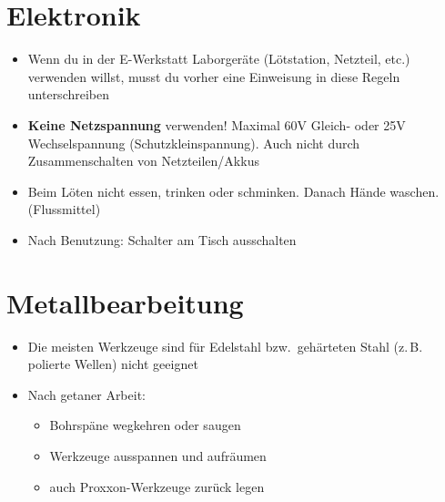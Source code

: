 \documentclass[13pt]{\basedir/fablab-document}
\begin{document}
\vbox{\vspace{0,5cm}}

\section{Elektronik}
\begin{itemize}
  \item Wenn du in der E-Werkstatt Laborgeräte (Lötstation, Netzteil, etc.) verwenden willst, musst du vorher eine Einweisung in diese Regeln unterschreiben
  \item \textbf{Keine Netzspannung} verwenden! Maximal 60V Gleich- oder 25V Wechselspannung (Schutzkleinspannung). Auch nicht durch Zusammenschalten von Netzteilen/Akkus

 \item Beim Löten nicht essen, trinken oder schminken. Danach Hände waschen. (Flussmittel)
 \item Nach Benutzung: Schalter am Tisch ausschalten
\end{itemize}


\section{Metallbearbeitung}
\begin{itemize}
	\item Die meisten Werkzeuge sind für Edelstahl bzw.\  gehärteten Stahl (z.\,B. polierte Wellen) nicht geeignet
	\item Nach getaner Arbeit:
	\begin{itemize}
		\item Bohrspäne wegkehren oder saugen
		\item Werkzeuge ausspannen und aufräumen
		\item auch Proxxon-Werkzeuge zurück legen
	\end{itemize}
\end{itemize}


\end{document}
